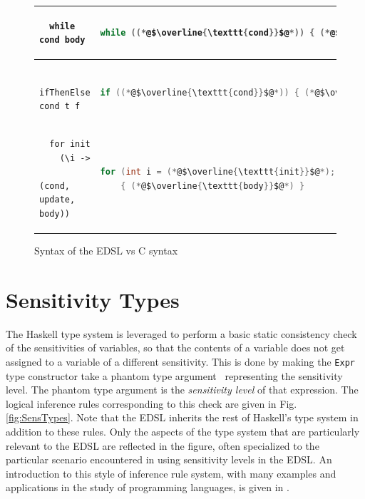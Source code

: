 \documentclass[10pt, conference]{IEEEtran}
\newcommand{\ttt}{\texttt}
\begin{document}
\begin{figure}
\begin{tabular}{|l|l|}
  \hline
  \begin{lstlisting}
  while cond body
  \end{lstlisting}
  & \begin{lstlisting}[language=C]
  while ((*@$\overline{\ttt{cond}}$@*)) { (*@$\overline{\ttt{body}}$@*) }
  \end{lstlisting}\\

  \hline
  \begin{lstlisting}
  ifThenElse cond t f
  \end{lstlisting}
  & \begin{lstlisting}[language=C]
  if ((*@$\overline{\ttt{cond}}$@*)) { (*@$\overline{\ttt{t}}$@*) } else { (*@$\overline{\ttt{f}}$@*) }
  \end{lstlisting}\\

  \hline
  \begin{lstlisting}
  for init
    (\i ->
      (cond, update, body))
  \end{lstlisting}
  & \begin{lstlisting}[language=C]
  for (int i = (*@$\overline{\ttt{init}}$@*); (*@$\overline{\ttt{cond}}$@*); (*@$\overline{\ttt{update}}$@*))
    { (*@$\overline{\ttt{body}}$@*) }
  \end{lstlisting}\\


  \hline
\end{tabular}
\caption{Syntax of the EDSL vs C syntax}
\label{fig:Syntax}
\end{figure}

\section{Sensitivity Types}
\label{sec:SensTypes}
The Haskell type system is leveraged to perform a basic static consistency check
of the sensitivities of variables, so that the contents of a variable does not get assigned to a
variable of a different sensitivity. This is done by making the \verb|Expr| type
constructor take a phantom type argument~\cite{Phantom} representing the sensitivity level. The phantom type
argument is the \textit{sensitivity level} of that expression.  The logical
inference rules corresponding to this check are given in Fig.
\ref{fig:SensTypes}. Note that the EDSL inherits the rest of Haskell's type
system in addition to these rules. Only the aspects of the type system that are
particularly relevant to the EDSL are reflected in the figure, often specialized
to the particular scenario encountered in using sensitivity levels in the EDSL.
An introduction to this style of inference rule system, with many examples and
applications in the study of programming languages, is given in
\cite{HarperFoundations}.
\end{document}
